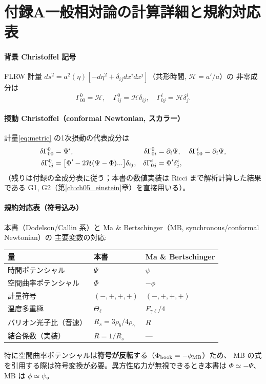 \section*{付録A\quad 一般相対論の計算詳細と規約対応表}

\paragraph{背景 Christoffel 記号}
FLRW 計量 $ds^2=a^2(\eta)[-d\eta^2+\delta_{ij}dx^idx^j]$（共形時間, $\mathcal H=a'/a$）の
非零成分は
\begin{equation}
  \Gamma^0_{00}=\mathcal H,\quad \Gamma^0_{ij}=\mathcal H\delta_{ij},\quad
  \Gamma^i_{0j}=\mathcal H\delta^i_j.
\end{equation}

\paragraph{摂動 Christoffel（conformal Newtonian, スカラー）}
計量\eqref{eq:metric} の1次摂動の代表成分は
\begin{align}
  \delta\Gamma^0_{00}&=\Psi', & \delta\Gamma^0_{0i}&=\partial_i\Psi, &
  \delta\Gamma^i_{00}&=\partial_i\Psi, \notag\\
  \delta\Gamma^0_{ij}&=\big[\Phi'-2\mathcal H(\Psi-\Phi)... \big]\delta_{ij}, &
  \delta\Gamma^i_{0j}&=\Phi'\delta^i_j,
\end{align}
（残りは付録の全成分表に従う；本書の数値実装は Ricci まで解析計算した結果である
G1, G2（第\ref{ch:ch05_einstein}章）を直接用いる）。

\paragraph{規約対応表（符号込み）}
本書（Dodelson/Callin 系）と Ma \& Bertschinger（MB, synchronous/conformal Newtonian）の
主要変数の対応:
\begin{center}
\begin{tabular}{lll}
\hline
量 & 本書 & Ma \& Bertschinger \\
\hline
時間ポテンシャル & $\Psi$ & $\psi$ \\
空間曲率ポテンシャル & $\Phi$ & $-\phi$ \\
計量符号 & $(-,+,+,+)$ & $(-,+,+,+)$ \\
温度多重極 & $\Theta_\ell$ & $F_{\gamma\ell}/4$ \\
バリオン光子比（音速） & $R_s=3\rho_b/4\rho_\gamma$ & $R$ \\
結合係数（実装） & $R=1/R_s$ & --- \\
\hline
\end{tabular}
\end{center}
特に空間曲率ポテンシャルは\textbf{符号が反転}する（$\Phi_{\rm book}=-\phi_{\rm MB}$）ため、
MB の式を引用する際は符号変換が必要。異方性応力が無視できるとき本書は
$\Phi\simeq-\Psi$、MB は $\phi\simeq\psi$。
